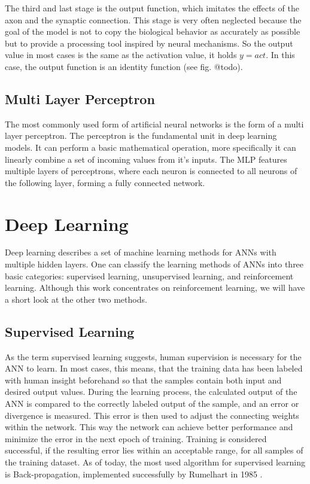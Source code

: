 \documentclass[12pt,a4paper]{article}
\begin{document}
The third and last stage is the output function, which imitates the effects of the axon and the synaptic connection. This stage is very often neglected because the goal of the model is not to copy the biological behavior as accurately as possible but to provide a processing tool inspired by neural mechanisms. So the output value in most cases is the same as the activation value, it holds $y = act$. In this case, the output function is an identity function (see fig. @todo).
\subsection{Multi Layer Perceptron}
The most commonly used form of artificial neural networks is the form of a multi layer perceptron. The perceptron is the fundamental unit in deep learning models. It can perform a basic mathematical operation, more specifically it can linearly
combine a set of incoming values from it's inputs. The MLP features multiple layers of perceptrons, where each neuron is connected to all neurons of the following layer, forming a fully connected network.
\section{Deep Learning}
Deep learning describes a set of machine learning methods for ANNs with multiple hidden layers. One can classify the learning methods of ANNs into three basic categories:  supervised learning, unsupervised learning, and reinforcement learning. Although this work concentrates on reinforcement learning, we will have a short look at the other two methods.
\subsection{Supervised Learning}
As the term supervised learning suggests, human supervision is necessary for the ANN to learn. In most cases, this means, that the training data has been labeled with human insight beforehand so that the samples contain both input and desired output values. During the learning process, the calculated output of the ANN is compared to the correctly labeled output of the sample, and an error or divergence is measured. This error is then used to adjust the connecting weights within the network. This way the network can achieve better performance and minimize the error in the next epoch of training. 
Training is considered successful, if the resulting error lies within an acceptable range, for all samples of the training dataset.
As of today, the most used algorithm for supervised learning is Back-propagation, implemented successfully by Rumelhart in 1985 \cite{Rumelhart1985}\cite{Patterson1997}.
\end{document}
